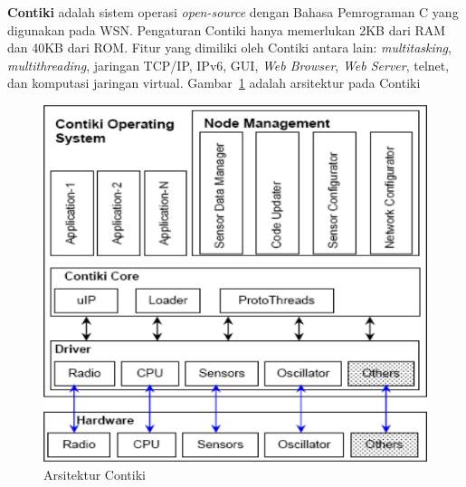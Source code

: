 \documentclass[a4paper,twoside]{article}
\begin{document}
\begin{enumerate}
\textbf{Contiki} adalah sistem operasi \textit{open-source} dengan Bahasa Pemrograman C yang digunakan pada WSN. Pengaturan Contiki hanya memerlukan 2KB dari RAM dan 40KB dari ROM. Fitur yang dimiliki oleh Contiki antara lain: \textit{multitasking}, \textit{multithreading}, jaringan TCP/IP, IPv6, GUI, \textit{Web Browser}, \textit{Web Server}, telnet, dan komputasi jaringan virtual. Gambar~\ref{fig:contiki} adalah arsitektur pada Contiki
\begin{figure} [H]
	\centering  
	\includegraphics[scale=3]{Gambar/contiki}  
	\caption[Arsitektur Contiki]{Arsitektur Contiki} 
	\label{fig:contiki} 
\end{figure}


\end{enumerate}
\end{document}
